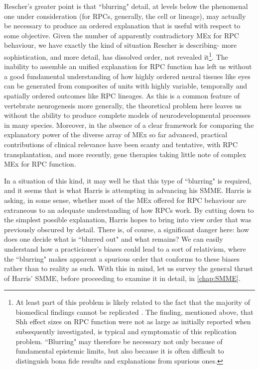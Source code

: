 Rescher's greater point is that ``blurring" detail, at levels below the phenomenal one under consideration (for RPCs, generally, the cell or lineage), may actually be necessary to produce an ordered explanation that is useful with respect to some objective. Given the number of apparently contradictory MEx for RPC behaviour, we have exactly the kind of situation Rescher is describing- more sophistication, and more detail, has dissolved order, not revealed it\footnote{At least part of this problem is likely related to the fact that the majority of biomedical findings cannot be replicated \cite{Ioannidis2005}. The finding, mentioned above, that Shh effect sizes on RPC function were not as large as initially reported when subsequently investigated, is typical and symptomatic of this replication problem. ``Blurring" may therefore be necessary not only because of fundamental epistemic limits, but also because it is often difficult to distinguish bona fide results and explanations from spurious ones.}. The inability to assemble an unified explanation for RPC function has left us without a good fundamental understanding of how highly ordered neural tissues like eyes can be generated from composites of units with highly variable, temporally and spatially ordered outcomes like RPC lineages. As this is a common feature of vertebrate neurogenesis more generally, the theoretical problem here leaves us without the ability to produce complete models of neurodevelopmental processes in many species. Moreover, in the absence of a clear framework for comparing the explanatory power of the diverse array of MEx so far advanced, practical contributions of clinical relevance have been scanty and tentative, with RPC transplantation, and more recently, gene therapies taking little note of complex MEx for RPC function\cite{Coles2004,Gaillard2007,Yao2018}.

In a situation of this kind, it may well be that this type of ``blurring" is required, and it seems that is what Harris is attempting in advancing his SMME. Harris is asking, in some sense, whether most of the MEx offered for RPC behaviour are extraneous to an adequate understanding of how RPCs work. By cutting down to the simplest possible explanation, Harris hopes to bring into view order that was previously obscured by detail. There is, of course, a significant danger here: how does one decide what is ``blurred out" and what remains? We can easily understand how a practicioner's biases could lead to a sort of relativism, where the ``blurring" makes apparent a spurious order that conforms to these biases rather than to reality as such. With this in mind, let us survey the general thrust of Harris' SMME, before proceeding to examine it in detail, in \autoref{chap:SMME}.


